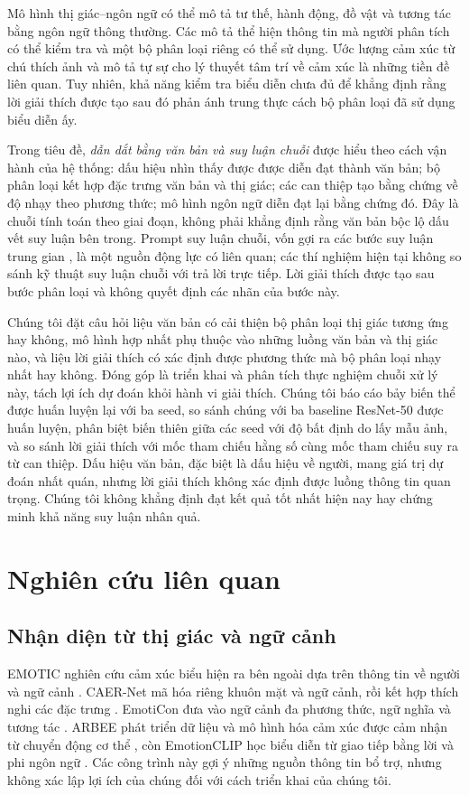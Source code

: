 \documentclass[conference]{IEEEtran}
\begin{document}
Mô hình thị giác--ngôn ngữ có thể mô tả tư thế, hành động, đồ vật và tương tác bằng ngôn ngữ thông thường. Các mô tả thể hiện thông tin mà người phân tích có thể kiểm tra và một bộ phân loại riêng có thể sử dụng. Ước lượng cảm xúc từ chú thích ảnh \cite{captions} và mô tả tự sự cho lý thuyết tâm trí về cảm xúc \cite{etom} là những tiền đề liên quan. Tuy nhiên, khả năng kiểm tra biểu diễn chưa đủ để khẳng định rằng lời giải thích được tạo sau đó phản ánh trung thực cách bộ phân loại đã sử dụng biểu diễn ấy.

Trong tiêu đề, \emph{dẫn dắt bằng văn bản và suy luận chuỗi} được hiểu theo cách vận hành của hệ thống: dấu hiệu nhìn thấy được được diễn đạt thành văn bản; bộ phân loại kết hợp đặc trưng văn bản và thị giác; các can thiệp tạo bằng chứng về độ nhạy theo phương thức; mô hình ngôn ngữ diễn đạt lại bằng chứng đó. Đây là chuỗi tính toán theo giai đoạn, không phải khẳng định rằng văn bản bộc lộ dấu vết suy luận bên trong. Prompt suy luận chuỗi, vốn gợi ra các bước suy luận trung gian \cite{cot}, là một nguồn động lực có liên quan; các thí nghiệm hiện tại không so sánh kỹ thuật suy luận chuỗi với trả lời trực tiếp. Lời giải thích được tạo sau bước phân loại và không quyết định các nhãn của bước này.

Chúng tôi đặt câu hỏi liệu văn bản có cải thiện bộ phân loại thị giác tương ứng hay không, mô hình hợp nhất phụ thuộc vào những luồng văn bản và thị giác nào, và liệu lời giải thích có xác định được phương thức mà bộ phân loại nhạy nhất hay không. Đóng góp là triển khai và phân tích thực nghiệm chuỗi xử lý này, tách lợi ích dự đoán khỏi hành vi giải thích. Chúng tôi báo cáo bảy biến thể được huấn luyện lại với ba seed, so sánh chúng với ba baseline ResNet-50 được huấn luyện, phân biệt biến thiên giữa các seed với độ bất định do lấy mẫu ảnh, và so sánh lời giải thích với mốc tham chiếu hằng số cùng mốc tham chiếu suy ra từ can thiệp. Dấu hiệu văn bản, đặc biệt là dấu hiệu về người, mang giá trị dự đoán nhất quán, nhưng lời giải thích không xác định được luồng thông tin quan trọng. Chúng tôi không khẳng định đạt kết quả tốt nhất hiện nay hay chứng minh khả năng suy luận nhân quả.

\section{Nghiên cứu liên quan}\label{sec:related}
\subsection{Nhận diện từ thị giác và ngữ cảnh}
EMOTIC nghiên cứu cảm xúc biểu hiện ra bên ngoài dựa trên thông tin về người và ngữ cảnh \cite{emotic}. CAER-Net mã hóa riêng khuôn mặt và ngữ cảnh, rồi kết hợp thích nghi các đặc trưng \cite{caer}. EmotiCon đưa vào ngữ cảnh đa phương thức, ngữ nghĩa và tương tác \cite{emoticon}. ARBEE phát triển dữ liệu và mô hình hóa cảm xúc được cảm nhận từ chuyển động cơ thể \cite{arbee}, còn EmotionCLIP học biểu diễn từ giao tiếp bằng lời và phi ngôn ngữ \cite{emotionclip}. Các công trình này gợi ý những nguồn thông tin bổ trợ, nhưng không xác lập lợi ích của chúng đối với cách triển khai của chúng tôi.
\end{document}

